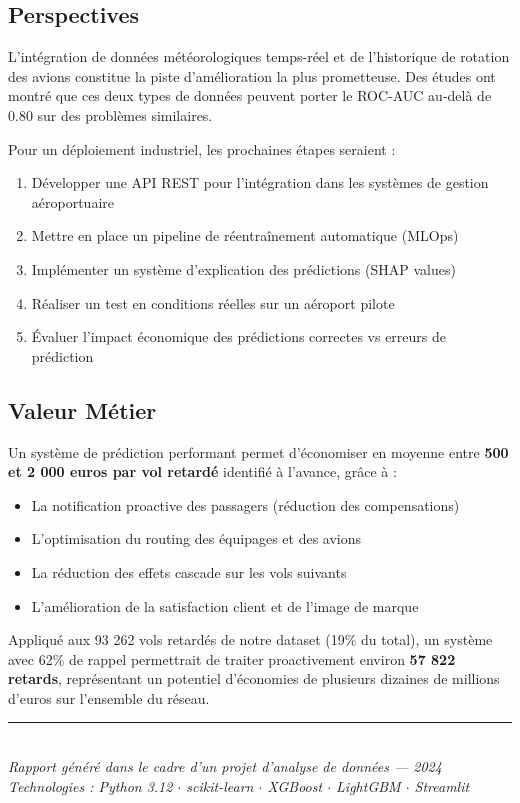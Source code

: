 \documentclass[12pt,a4paper]{article}
\begin{document}
\subsection{Perspectives}

L'intégration de données météorologiques temps-réel et de l'historique de rotation 
des avions constitue la piste d'amélioration la plus prometteuse. Des études ont 
montré que ces deux types de données peuvent porter le ROC-AUC au-delà de 0.80 
sur des problèmes similaires.

Pour un déploiement industriel, les prochaines étapes seraient :
\begin{enumerate}[leftmargin=*]
  \item Développer une API REST pour l'intégration dans les systèmes de gestion aéroportuaire
  \item Mettre en place un pipeline de réentraînement automatique (MLOps)
  \item Implémenter un système d'explication des prédictions (SHAP values)
  \item Réaliser un test en conditions réelles sur un aéroport pilote
  \item Évaluer l'impact économique des prédictions correctes vs erreurs de prédiction
\end{enumerate}

\subsection{Valeur Métier}

Un système de prédiction performant permet d'économiser en moyenne entre 
\textbf{500 et 2 000 euros par vol retardé} identifié à l'avance, grâce à :
\begin{itemize}[leftmargin=*]
  \item La notification proactive des passagers (réduction des compensations)
  \item L'optimisation du routing des équipages et des avions
  \item La réduction des effets cascade sur les vols suivants
  \item L'amélioration de la satisfaction client et de l'image de marque
\end{itemize}

Appliqué aux 93 262 vols retardés de notre dataset (19\% du total), 
un système avec 62\% de rappel permettrait de traiter proactivement 
environ \textbf{57 822 retards}, représentant un potentiel d'économies 
de plusieurs dizaines de millions d'euros sur l'ensemble du réseau.

\vspace{1cm}
\begin{center}
  \rule{0.5\textwidth}{0.4pt}\\[0.3cm]
  {\small\itshape Rapport généré dans le cadre d'un projet d'analyse de données --- 2024}\\
  {\small\itshape Technologies : Python 3.12 $\cdot$ scikit-learn $\cdot$ XGBoost $\cdot$ LightGBM $\cdot$ Streamlit}
\end{center}
\end{document}
